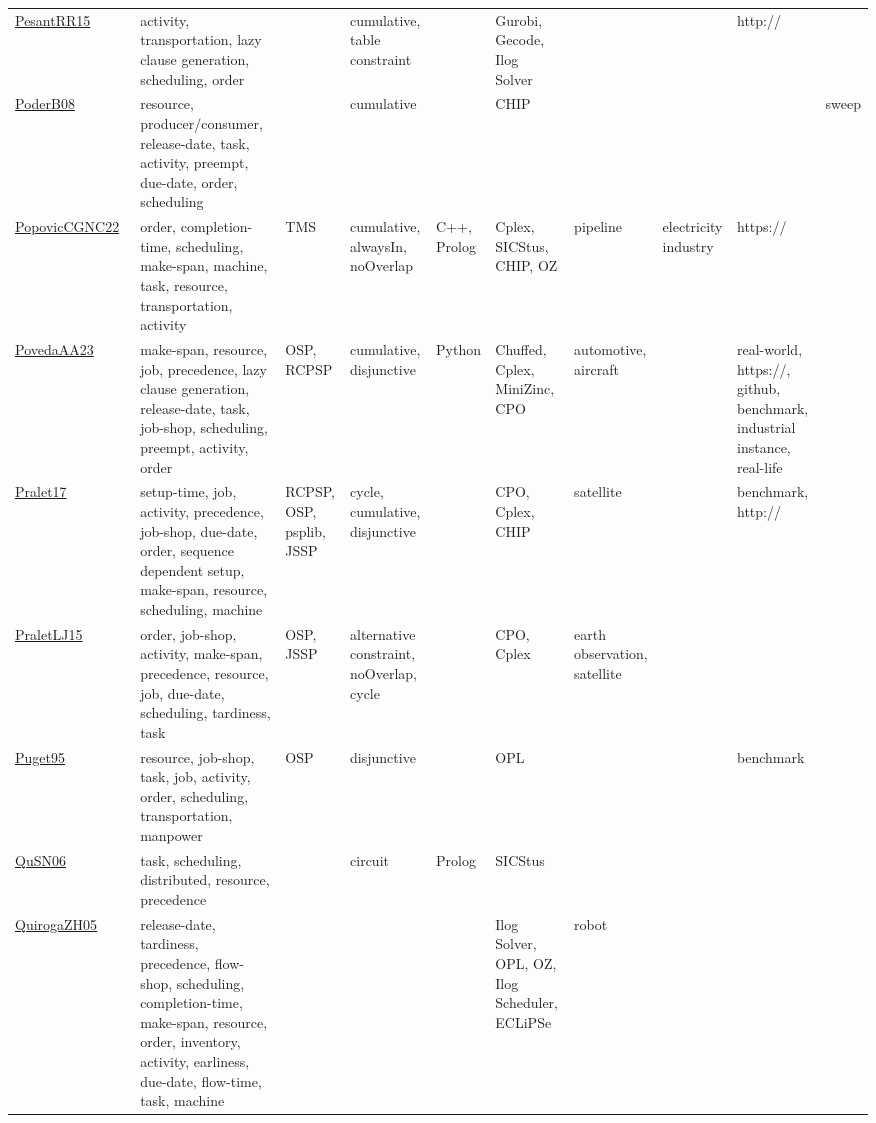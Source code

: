 {\begin{longtable}{p{3cm}p{4cm}p{2cm}p{2cm}p{2cm}p{2cm}p{2cm}p{2cm}p{2cm}p{2cm}}
\href{papers/PesantRR15.pdf}{PesantRR15}~\cite{PesantRR15} & activity, transportation, lazy clause generation, scheduling, order &  & cumulative, table constraint &  & Gurobi, Gecode, Ilog Solver &  &  & http:// & \\
\href{papers/PoderB08.pdf}{PoderB08}~\cite{PoderB08} & resource, producer/consumer, release-date, task, activity, preempt, due-date, order, scheduling &  & cumulative &  & CHIP &  &  &  & sweep\\
\href{papers/PopovicCGNC22.pdf}{PopovicCGNC22}~\cite{PopovicCGNC22} & order, completion-time, scheduling, make-span, machine, task, resource, transportation, activity & TMS & cumulative, alwaysIn, noOverlap & C++, Prolog & Cplex, SICStus, CHIP, OZ & pipeline & electricity industry & https:// & \\
\href{papers/PovedaAA23.pdf}{PovedaAA23}~\cite{PovedaAA23} & make-span, resource, job, precedence, lazy clause generation, release-date, task, job-shop, scheduling, preempt, activity, order & OSP, RCPSP & cumulative, disjunctive & Python & Chuffed, Cplex, MiniZinc, CPO & automotive, aircraft &  & real-world, https://, github, benchmark, industrial instance, real-life & \\
\href{papers/Pralet17.pdf}{Pralet17}~\cite{Pralet17} & setup-time, job, activity, precedence, job-shop, due-date, order, sequence dependent setup, make-span, resource, scheduling, machine & RCPSP, OSP, psplib, JSSP & cycle, cumulative, disjunctive &  & CPO, Cplex, CHIP & satellite &  & benchmark, http:// & \\
\href{papers/PraletLJ15.pdf}{PraletLJ15}~\cite{PraletLJ15} & order, job-shop, activity, make-span, precedence, resource, job, due-date, scheduling, tardiness, task & OSP, JSSP & alternative constraint, noOverlap, cycle &  & CPO, Cplex & earth observation, satellite &  &  & \\
\href{papers/Puget95.pdf}{Puget95}~\cite{Puget95} & resource, job-shop, task, job, activity, order, scheduling, transportation, manpower & OSP & disjunctive &  & OPL &  &  & benchmark & \\
\href{papers/QuSN06.pdf}{QuSN06}~\cite{QuSN06} & task, scheduling, distributed, resource, precedence &  & circuit & Prolog & SICStus &  &  &  & \\
\href{papers/QuirogaZH05.pdf}{QuirogaZH05}~\cite{QuirogaZH05} & release-date, tardiness, precedence, flow-shop, scheduling, completion-time, make-span, resource, order, inventory, activity, earliness, due-date, flow-time, task, machine &  &  &  & Ilog Solver, OPL, OZ, Ilog Scheduler, ECLiPSe & robot &  &  & \\

\end{longtable}}

